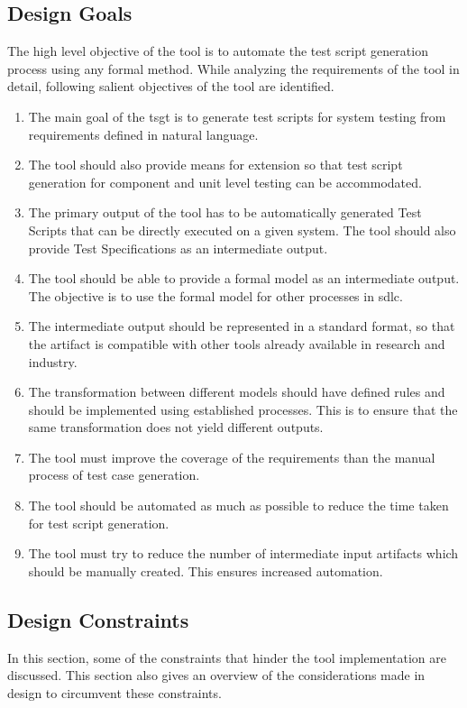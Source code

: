 \subsection{Design Goals}
The high level objective of the tool is to automate the test script generation process using any formal method. While analyzing the requirements of the tool in detail, following salient objectives of the tool are identified.
\begin{enumerate}
\item The main goal of the \gls{tsgt} is to generate test scripts for system testing from requirements defined in natural language.
\item The tool should also provide means for extension so that test script generation for component and unit level testing can be accommodated.
\item The primary output of the tool has to be automatically generated Test Scripts that can be directly executed on a given system. The tool should also provide Test Specifications as an intermediate output.
\item The tool should be able to provide a formal model as an intermediate output. The objective is to use the formal model for other processes in \gls{sdlc}.
\item The intermediate output should be represented in a standard format, so that the artifact is compatible with other tools already available in research and industry.
\item The transformation between different models should have defined rules and should be implemented using established processes. This is to ensure that the same transformation does not yield different outputs.
\item The tool must improve the coverage of the requirements than the manual process of test case generation.
\item The tool should be automated as much as possible to reduce the time taken for test script generation.
\item The tool must try to reduce the number of intermediate input artifacts which should be manually created. This ensures increased automation.
\end{enumerate}


\subsection{Design Constraints}
In this section, some of the constraints that hinder the tool implementation are discussed. This section also gives an overview of the considerations made in design to circumvent these constraints.


